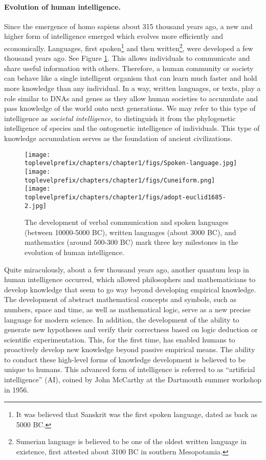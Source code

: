\documentclass[../../book-main.tex]{subfiles}
\begin{document}
\paragraph{Evolution of human intelligence.}
Since the emergence of homo sapiens about 315 thousand years ago, a new and higher form of intelligence emerged which evolves more efficiently and economically. Languages, first spoken\footnote{It was believed that Sanskrit was the first spoken language, dated as back as 5000 BC.} and then written\footnote{Sumerian language is believed to be one of the oldest written language in existence, first attested about 3100 BC in southern Mesopotamia.}, were developed a few thousand years ago. See Figure \ref{fig:human-intelligence}. This allows individuals to communicate and share useful information with others. Therefore, a human community or society can behave like a single intelligent organism that can learn much faster and hold more knowledge than any individual. In a way, written languages, or texts, play a role similar to DNAs and genes as they allow human societies to accumulate and pass knowledge of the world onto next generations. We may refer to this type of intelligence as {\em  societal intelligence}, to distinguish it from the phylogenetic intelligence of species and the ontogenetic intelligence of individuals. This type of knowledge accumulation serves as the foundation of ancient civilizations.
\begin{figure}
    \centering
    \texttt{[image: \\toplevelprefix/chapters/chapter1/figs/Spoken-language.jpg]}
   \hspace{5mm} \texttt{[image: \\toplevelprefix/chapters/chapter1/figs/Cuneiform.png]}
   \hspace{5mm} \texttt{[image: \\toplevelprefix/chapters/chapter1/figs/adopt-euclid1685-2.jpg]}
    \caption{The development of verbal communication and spoken languages (between 10000-5000 BC), written languages (about 3000 BC), and mathematics (around 500-300 BC) mark three key milestones in the evolution of human intelligence.}
    \label{fig:human-intelligence}
\end{figure}

Quite miraculously, about a few thousand years ago, another quantum leap in human intelligence occurred, which allowed philosophers and mathematicians to develop knowledge that seem to go way beyond developing empirical knowledge. The development of abstract mathematical concepts and symbols, such as numbers, space and time, as well as mathematical logic, serve as a new precise language for modern science. In addition, the development of the ability to generate new hypotheses and verify their correctness based on  logic deduction or scientific experimentation. This, for the first time, has enabled humans to proactively develop new knowledge beyond passive empirical means. The ability to conduct these high-level forms of knowledge development is believed to be unique to humans. This advanced form of intelligence is referred to as ``artificial intelligence'' (AI), coined by John McCarthy at the Dartmouth summer workshop in 1956. 
\end{document}
